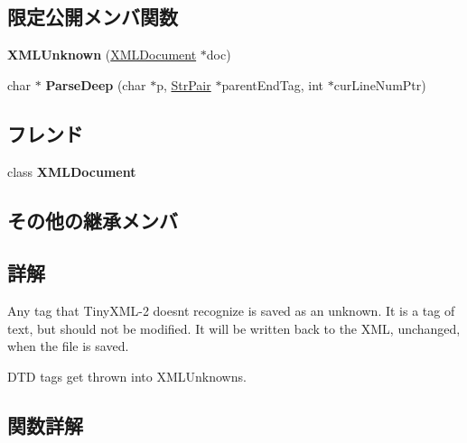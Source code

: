 \subsection*{限定公開メンバ関数}
\begin{DoxyCompactItemize}
\item 
\mbox{\label{classtinyxml2_1_1_x_m_l_unknown_a9391eb679598d50baba424e6f1aa367b}} 
{\bfseries X\+M\+L\+Unknown} (\hyperlink{classtinyxml2_1_1_x_m_l_document}{X\+M\+L\+Document} $\ast$doc)
\item 
\mbox{\label{classtinyxml2_1_1_x_m_l_unknown_aefc332cc1e6e25736f364d1e5eeb31fe}} 
char $\ast$ {\bfseries Parse\+Deep} (char $\ast$p, \hyperlink{classtinyxml2_1_1_str_pair}{Str\+Pair} $\ast$parent\+End\+Tag, int $\ast$cur\+Line\+Num\+Ptr)
\end{DoxyCompactItemize}
\subsection*{フレンド}
\begin{DoxyCompactItemize}
\item 
\mbox{\label{classtinyxml2_1_1_x_m_l_unknown_a4eee3bda60c60a30e4e8cd4ea91c4c6e}} 
class {\bfseries X\+M\+L\+Document}
\end{DoxyCompactItemize}
\subsection*{その他の継承メンバ}


\subsection{詳解}
Any tag that Tiny\+X\+M\+L-\/2 doesn\textquotesingle{}t recognize is saved as an unknown. It is a tag of text, but should not be modified. It will be written back to the X\+ML, unchanged, when the file is saved.

D\+TD tags get thrown into X\+M\+L\+Unknowns. 

\subsection{関数詳解}
\mbox{\label{classtinyxml2_1_1_x_m_l_unknown_a8a06b8c82117ca969a432e17a46830fc}} 
